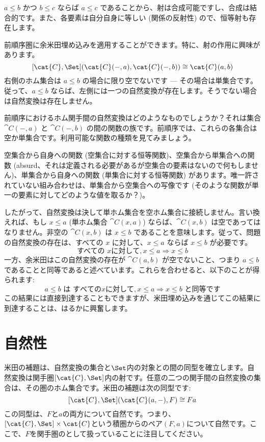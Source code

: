 $a \leqslant b$ かつ $b \leqslant c$ ならば $a \leqslant c$ であることから、射は合成可能ですし、合成は結合的です。また、各要素は自分自身に等しい (関係の反射性) ので、恒等射も存在します。

前順序圏に余米田埋め込みを適用することができます。特に、射の作用に興味があります。
\[[\cat{C}, \Set](\cat{C}(-, a), \cat{C}(-, b)) \cong \cat{C}(a, b)\]
右側のホム集合は $a \leqslant b$ の場合に限り空でないです — その場合は単集合です。従って、$a \leqslant b$ ならば、左側には一つの自然変換が存在します。そうでない場合は自然変換は存在しません。

前順序におけるホム関手間の自然変換はどのようなものでしょうか？それは集合 $\cat{C}(-, a)$ と $\cat{C}(-, b)$ の間の関数の族です。前順序では、これらの各集合は空か単集合です。利用可能な関数の種類を見てみましょう。

空集合から自身への関数 (空集合に対する恒等関数)、空集合から単集合への関数 (absurd、それは定義される必要があるが空集合の要素はないので何もしません)、単集合から自身への関数 (単集合に対する恒等関数) があります。唯一許されていない組み合わせは、単集合から空集合への写像です (そのような関数が単一の要素に対してどのような値を取るか？)。

したがって、自然変換は決して単ホム集合を空ホム集合に接続しません。言い換えれば、もし $x \leqslant a$  (単ホム集合 $\cat{C}(x, a)$) ならば、$\cat{C}(x, b)$ は空であってはなりません。非空の $\cat{C}(x, b)$ は $x \leqslant b$ であることを意味します。従って、問題の自然変換の存在は、すべての $x$ に対して、$x \leqslant a$ ならば $x \leqslant b$ が必要です。
\[\text{すべての } x に対して, x \leqslant a \Rightarrow x \leqslant b\]
一方、余米田はこの自然変換の存在が $\cat{C}(a, b)$ が空でないこと、つまり $a \leqslant b$ であることと同等であると述べています。これらを合わせると、以下のことが得られます: 
\[a \leqslant b \text{ は } すべての x に対して, x \leqslant a \Rightarrow x \leqslant b \text{ と同等です}\]
この結果には直接到達することもできますが、米田埋め込みを通じてこの結果に到達することは、はるかに興奮します。

\section{自然性}

米田の補題は、自然変換の集合と$\Set$内の対象との間の同型を確立します。自然変換は関手圏$[\cat{C}, \Set]$内の射です。任意の二つの関手間の自然変換の集合は、その圏のホム集合です。米田の補題は次の同型です: 
\[[\cat{C}, \Set](\cat{C}(a, -), F) \cong F a\]
この同型は、$F$と$a$の両方について自然です。つまり、$[\cat{C}, \Set] \times \cat{C}$という積圏からのペア$(F, a)$について自然です。ここで、$F$を関手圏のとして扱っていることに注目してください。

